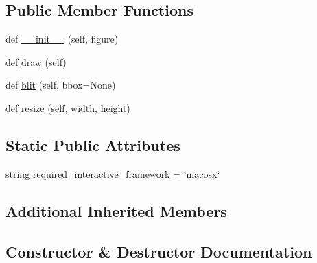 \subsection*{Public Member Functions}
\begin{DoxyCompactItemize}
\item 
def \hyperlink{classmatplotlib_1_1backends_1_1backend__macosx_1_1FigureCanvasMac_accb34db5d09de6dc10f3d53a865e3546}{\+\_\+\+\_\+init\+\_\+\+\_\+} (self, figure)
\item 
def \hyperlink{classmatplotlib_1_1backends_1_1backend__macosx_1_1FigureCanvasMac_a975339550ec3664e13482d2a0cf21bab}{draw} (self)
\item 
def \hyperlink{classmatplotlib_1_1backends_1_1backend__macosx_1_1FigureCanvasMac_a1ac24f44fa7c8d1c002544cfc71b865f}{blit} (self, bbox=None)
\item 
def \hyperlink{classmatplotlib_1_1backends_1_1backend__macosx_1_1FigureCanvasMac_af9ee6fcc3eaf4f3780796513c5fc0ccf}{resize} (self, width, height)
\end{DoxyCompactItemize}
\subsection*{Static Public Attributes}
\begin{DoxyCompactItemize}
\item 
string \hyperlink{classmatplotlib_1_1backends_1_1backend__macosx_1_1FigureCanvasMac_a8db1f1e9e5e5885036677b33bc695095}{required\+\_\+interactive\+\_\+framework} = \char`\"{}macosx\char`\"{}
\end{DoxyCompactItemize}
\subsection*{Additional Inherited Members}


\subsection{Constructor \& Destructor Documentation}
\mbox{\label{classmatplotlib_1_1backends_1_1backend__macosx_1_1FigureCanvasMac_accb34db5d09de6dc10f3d53a865e3546}} 
